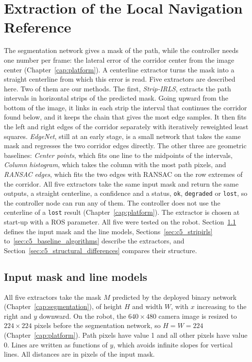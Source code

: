 \chapter{Extraction of the Local Navigation Reference}
\label{cap:geometric_reference}

The segmentation network gives a mask of the path, while the controller needs one number per frame: the lateral error of the corridor center from the image center (Chapter~\ref{cap:platform}). A centerline extractor turns the mask into a straight centerline from which this error is read. Five extractors are described here. Two of them are our methods. The first, \textit{Strip-IRLS}, extracts the path intervals in horizontal strips of the predicted mask. Going upward from the bottom of the image, it links in each strip the interval that continues the corridor found below, and it keeps the chain that gives the most edge samples. It then fits the left and right edges of the corridor separately with iteratively reweighted least squares. \textit{EdgeNet}, still at an early stage, is a small network that takes the same mask and regresses the two corridor edges directly. The other three are geometric baselines: \textit{Center points}, which fits one line to the midpoints of the intervals, \textit{Column histogram}, which takes the column with the most path pixels, and \textit{RANSAC edges}, which fits the two edges with RANSAC on the row extremes of the corridor. All five extractors take the same input mask and return the same outputs, a straight centerline, a confidence and a status, \texttt{ok}, \texttt{degraded} or \texttt{lost}, so the controller node can run any of them. The controller does not use the centerline of a \texttt{lost} result (Chapter~\ref{cap:platform}). The extractor is chosen at start-up with a ROS parameter. All five were tested on the robot. Section~\ref{sec:c5_input} defines the input mask and the line models, Sections~\ref{sec:c5_stripirls} to~\ref{sec:c5_baseline_algorithms} describe the extractors, and Section~\ref{sec:c5_structural_differences} compares their structure.

\section{Input mask and line models}
\label{sec:c5_input}

All five extractors take the mask $M$ predicted by the deployed binary network (Chapter~\ref{cap:segmentation}), of height $H$ and width $W$, with $x$ increasing to the right and $y$ downward. On the robot, the $640\times480$ camera image is resized to $224\times224$ pixels before the segmentation network, so $H=W=224$ (Chapter~\ref{cap:platform}). Path pixels have value 1 and all other pixels have value 0. Lines are written as functions of $y$, which avoids infinite slopes for vertical lines. All distances are in pixels of the input mask.

